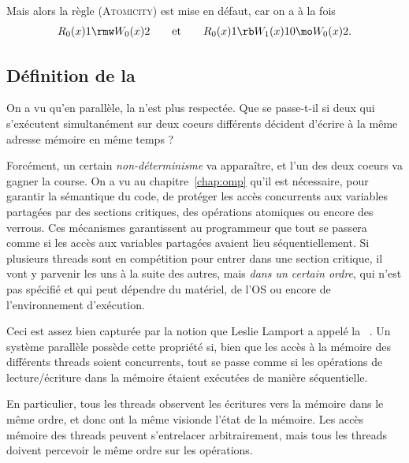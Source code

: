Mais alors la règle (\textsc{Atomicity}) est mise en défaut, car on a à la fois
\[
  R_0(x)1 \rmw W_0(x)2 \qquad\text{et}\qquad R_0(x)1 \rb W_1(x)10 \mo W_0(x)2.
\]

\subsection{Définition de la }
\label{sec:sequential-consistency}

On a vu qu'en parallèle, la  n'est plus
respectée. Que se passe-t-il si deux  qui s'exécutent
simultanément sur deux coeurs différents décident d'écrire à la même adresse
mémoire en même temps ?

Forcément, un certain \emph{non-déterminisme} va apparaître, et l'un
des deux coeurs va \og gagner la course\fg. On a vu au
chapitre~\ref{chap:omp} qu'il est nécessaire, pour garantir la
sémantique du code, de protéger les accès concurrents aux variables
partagées par des sections critiques, des opérations atomiques ou
encore des verrous. Ces mécanismes garantissent au programmeur que
tout se passera comme si les accès aux variables partagées avaient
lieu séquentiellement. Si plusieurs threads sont en compétition pour
entrer dans une section critique, il vont y parvenir les uns à la
suite des autres, mais \emph{dans un certain ordre}, qui n'est pas
spécifié et qui peut dépendre du matériel, de l'OS ou encore de
l'environnement d'exécution.

Ceci est assez bien capturée par la notion que Leslie Lamport a appelé la
~\cite{Lamport79}. Un système parallèle possède
cette propriété si, bien que les accès à la mémoire des différents threads
soient concurrents, tout se passe comme si les opérations de lecture/écriture
dans la mémoire étaient exécutées de manière séquentielle.

En particulier, tous les threads observent les écritures vers la mémoire dans le
même ordre, et donc ont la même \og vision\fg de l'état de la mémoire. Les accès
mémoire des threads peuvent s'entrelacer arbitrairement, mais tous les threads
doivent percevoir le même ordre sur les opérations.

